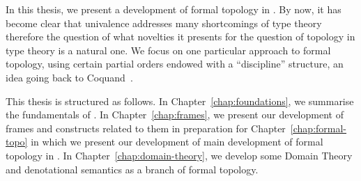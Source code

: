 In this thesis, we present a development of formal topology in \UF{}. By now, it has
become clear that univalence addresses many shortcomings of type theory therefore the
question of what novelties it presents for the question of topology in type theory is a
natural one. We focus on one particular approach to formal topology, using certain partial
orders endowed with a ``discipline'' structure, an idea going back to
Coquand~\cite{coq-posets}.

This thesis is structured as follows. In Chapter~\ref{chap:foundations}, we summarise the
fundamentals of \UF{}. In Chapter~\ref{chap:frames}, we present our development of frames
and constructs related to them in preparation for Chapter~\ref{chap:formal-topo} in which
we present our development of main development of formal topology in \UF{}. In
Chapter~\ref{chap:domain-theory}, we develop some Domain Theory and denotational semantics
as a branch of formal topology.
